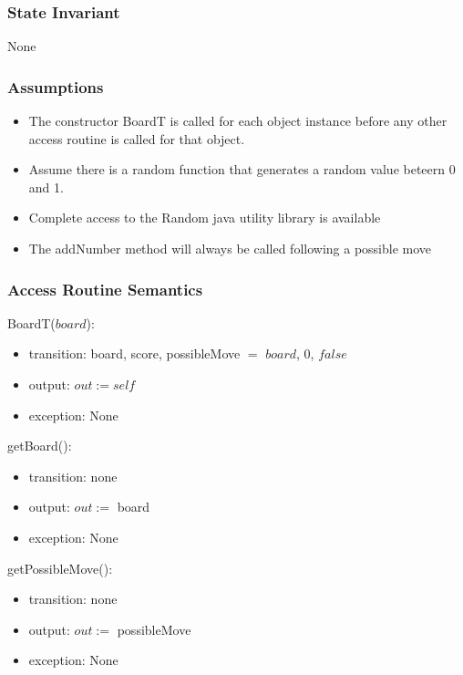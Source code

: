 \documentclass[12pt]{article}
\begin{document}
\subsubsection* {State Invariant}

None

\subsubsection* {Assumptions}

\begin{itemize}
  \item The constructor BoardT is called for each object instance before any other access routine 
  is called for that object. 
  \item Assume there is a random function that generates a random value beteern 0 and 1.
  \item Complete access to the Random java utility library is available
  \item The addNumber method will always be called following a possible move
\end{itemize}

\subsubsection* {Access Routine Semantics}

\noindent BoardT($board$):
\begin{itemize}
\item transition: board, score, possibleMove $=$ $board$, 0, $false$
\item output: $out := \mathit{self}$
\item exception: None
\end{itemize}

\noindent getBoard():
\begin{itemize}
\item transition: none
\item output: $out :=$ board
\item exception: None
\end{itemize}

\newpage

\noindent getPossibleMove():
\begin{itemize}
\item transition: none
\item output: $out :=$ possibleMove
\item exception: None
\end{itemize}
\end{document}

